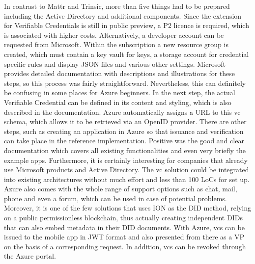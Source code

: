         In contrast to Mattr and Trinsic, more than five things had to be prepared including the Active Directory and additional components. Since the extension for Verifiable Credentials is still in public preview, a P2 licence is required, which is associated with higher costs. Alternatively, a developer account can be requested from Microsoft. Within the subscription a new resource group is created, which must contain a key vault for keys, a storage account for credential specific rules and display JSON files and various other settings. Microsoft provides detailed documentation with descriptions and illustrations for these steps, so this process was fairly straightforward. Nevertheless, this can definitely be confusing in some places for Azure beginners. In the next step, the actual Verifiable Credential can be defined in its content and styling, which is also described in the documentation. Azure automatically assigns a URL to this \ac{vc} schema, which allows it to be retrieved via an OpenID provider. There are other steps, such as creating an application in Azure so that issuance and verification can take place in the reference implementation. Positive was the good and clear documentation which covers all existing functionalities and even very briefly the example apps. Furthermore, it is certainly interesting for companies that already use Microsoft products and Active Directory. The \ac{vc} solution could be integrated into existing architectures without much effort and less than 100 LoCs for set up. Azure also comes with the whole range of support options such as chat, mail, phone and even a forum, which can be used in case of potential problems. Moreover, it is one of the few solutions that uses ION as the \ac{DID} method, relying on a public permissionless blockchain, thus actually creating independent \acp{DID} that can also embed metadata in their \ac{DID} documents. With Azure, \acp{vc} can be issued to the mobile app in JWT format and also presented from there as a \ac{VP} on the basis of a corresponding request. In addition, \acp{vc} can be revoked through the Azure portal.  
    
